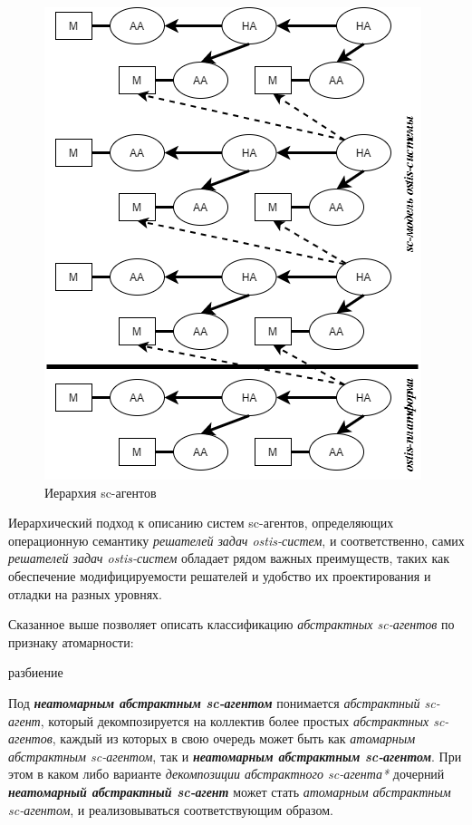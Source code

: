\begin{figure}[H]
	\includegraphics[scale=0.7]{images/part3/chapter_situation_management/agents-hierarchy.png}
	\caption{Иерархия sc-агентов}
	\label{fig:agents-hierarchy}
\end{figure}

Иерархический подход к описанию систем sc-агентов, определяющих операционную семантику \textit{решателей задач ostis-систем}, и соответственно, самих \textit{решателей задач ostis-систем} обладает рядом важных преимуществ, таких как обеспечение модифицируемости решателей и удобство их проектирования и отладки на разных уровнях.

Сказанное выше позволяет описать классификацию \textit{абстрактных sc-агентов} по признаку атомарности:

\begin{SCn}
	\begin{scnrelfromset}{разбиение}
	\end{scnrelfromset}
\end{SCn}

Под \textbf{\textit{неатомарным абстрактным sc-агентом}} понимается \textit{абстрактный sc-агент}, который декомпозируется на коллектив более простых \textit{абстрактных sc-агентов}, каждый из которых в свою очередь может быть как \textit{атомарным абстрактным sc-агентом}, так и \textbf{\textit{неатомарным абстрактным sc-агентом}}. При этом в каком либо варианте \textit{декомпозиции абстрактного sc-агента*} дочерний \textbf{\textit{неатомарный абстрактный sc-агент}} может стать \textit{атомарным абстрактным sc-агентом}, и реализовываться соответствующим образом.


